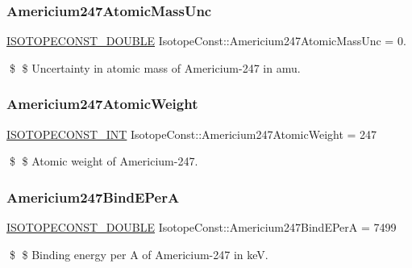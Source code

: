 \subsubsection{\texorpdfstring{Americium247\+Atomic\+Mass\+Unc}{Americium247AtomicMassUnc}}
{\footnotesize\ttfamily \mbox{\hyperlink{group___isotope_const-_macros_ga8f45a7272ce02c0b4c65c44636ed719a}{I\+S\+O\+T\+O\+P\+E\+C\+O\+N\+S\+T\+\_\+\+D\+O\+U\+B\+LE}} Isotope\+Const\+::\+Americium247\+Atomic\+Mass\+Unc = 0.}

\$ \$ Uncertainty in atomic mass of Americium-\/247 in amu. \mbox{\label{group___isotope_const-_americium-_am247_ga7f8a36da275b2fb911dd5264de95107e}} 
\subsubsection{\texorpdfstring{Americium247\+Atomic\+Weight}{Americium247AtomicWeight}}
{\footnotesize\ttfamily \mbox{\hyperlink{group___isotope_const-_macros_ga5f18360b3e99483a35c32d789e62621c}{I\+S\+O\+T\+O\+P\+E\+C\+O\+N\+S\+T\+\_\+\+I\+NT}} Isotope\+Const\+::\+Americium247\+Atomic\+Weight = 247}

\$ \$ Atomic weight of Americium-\/247. \mbox{\label{group___isotope_const-_americium-_am247_gafb64412f490e26aac3f09e3d6416cc08}} 
\subsubsection{\texorpdfstring{Americium247\+Bind\+E\+PerA}{Americium247BindEPerA}}
{\footnotesize\ttfamily \mbox{\hyperlink{group___isotope_const-_macros_ga8f45a7272ce02c0b4c65c44636ed719a}{I\+S\+O\+T\+O\+P\+E\+C\+O\+N\+S\+T\+\_\+\+D\+O\+U\+B\+LE}} Isotope\+Const\+::\+Americium247\+Bind\+E\+PerA = 7499}

\$ \$ Binding energy per A of Americium-\/247 in keV. \mbox{\label{group___isotope_const-_americium-_am247_gacd6519f809f7c46c221489ec17690f42}} 
